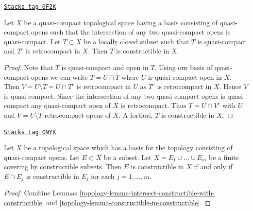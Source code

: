\begin{lemma}
\label{topology-lemma-locally-closed-constructible-image}
\href{https://stacks.math.columbia.edu/tag/0F2K}{\texttt{Stacks tag 0F2K}}

Let $X$ be a quasi-compact topological space having a basis consisting of
quasi-compact opens such that the intersection of any two
quasi-compact opens is quasi-compact.
Let $T \subset X$ be a locally closed subset
such that $T$ is quasi-compact and $T^c$ is retrocompact in $X$.
Then $T$ is constructible in $X$.
\end{lemma}

\begin{proof}
Note that $T$ is quasi-compact and open in $\overline{T}$.
Using our basis of quasi-compact opens we can write
$T = U \cap \overline{T}$ where $U$ is quasi-compact open in $X$.
Then $V = U \setminus T = U \cap T^c$ is retrocompact in $U$ as $T^c$
is retrocompact in $X$. Hence $V$ is quasi-compact. Since
the intersection of any two quasi-compact opens is quasi-compact
any quasi-compact open of $X$ is retrocompact. Thus $T = U \cap V^c$
with $U$ and $V = U \setminus T$ retrocompact opens of $X$.
A fortiori, $T$ is constructible in $X$.
\end{proof}

\begin{lemma}
\label{topology-lemma-collate-constructible-from-constructible}
\href{https://stacks.math.columbia.edu/tag/09YK}{\texttt{Stacks tag 09YK}}

Let $X$ be a topological space which has a basis for the topology
consisting of quasi-compact opens. Let $E \subset X$ be a subset.
Let $X = E_1 \cup \ldots \cup E_m$ be a finite covering by constructible
subsets. Then $E$ is constructible in $X$ if and only if $E \cap E_j$
is constructible in $E_j$ for each $j = 1, \ldots, m$.
\end{lemma}

\begin{proof}

Combine
Lemmas \ref{topology-lemma-intersect-constructible-with-constructible} and
\ref{topology-lemma-constructible-in-constructible}.
\end{proof}


